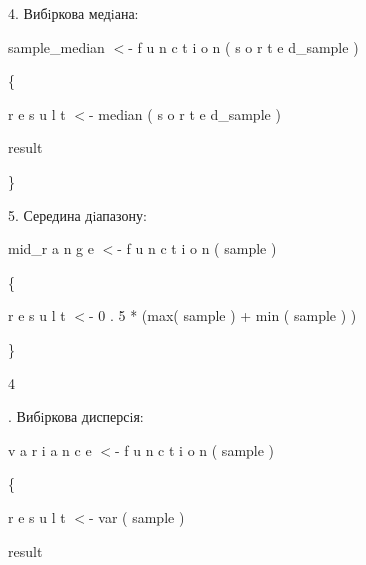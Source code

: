 \documentclass[a4paper,portrait,12pt]{article}
\begin{document}
\begin{flushleft}
4. Вибiркова медiана:
\end{flushleft}


\begin{flushleft}
sample\_median $<$- f u n c t i o n ( s o r t e d\_sample )
\end{flushleft}


\{


\begin{flushleft}
r e s u l t $<$- median ( s o r t e d\_sample )
\end{flushleft}


\begin{flushleft}
result
\end{flushleft}


\}





\begin{flushleft}
5. Середина дiапазону:
\end{flushleft}


\begin{flushleft}
mid\_r a n g e $<$- f u n c t i o n ( sample )
\end{flushleft}


\{


\begin{flushleft}
r e s u l t $<$- 0 . 5 * (max( sample ) + min ( sample ) )
\end{flushleft}


\}





4





\begin{flushleft}
. Вибiркова дисперсiя:
\end{flushleft}


\begin{flushleft}
v a r i a n c e $<$- f u n c t i o n ( sample )
\end{flushleft}


\{


\begin{flushleft}
r e s u l t $<$- var ( sample )
\end{flushleft}


\begin{flushleft}
result
\end{flushleft}
\end{document}
